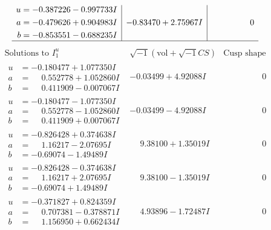 \documentclass[1p]{elsarticle_modified}
\theoremstyle{definition}
\newcommand{\I}{\sqrt{-1}}
\begin{document}
$$\begin{array}{c|c|c}
\begin{aligned}
u &= -0.387226 - 0.997733 I \\
a &= -0.479626 + 0.904983 I \\
b &= -0.853551 - 0.688235 I\end{aligned}
 & -0.83470 + 2.75967 I & \phantom{-0.000000 } 0\\
 \hline 
 \end{array}$$\newpage$$\begin{array}{c|c|c}  
\text{Solutions to }I^u_{1}& \I (\text{vol} + \sqrt{-1}CS) & \text{Cusp shape}\\
 \hline 
\begin{aligned}
u &= -0.180477 + 1.077350 I \\
a &= \phantom{-}0.552778 + 1.052860 I \\
b &= \phantom{-}0.411909 - 0.007067 I\end{aligned}
 & -0.03499 + 4.92088 I & \phantom{-0.000000 } 0 \\ \hline\begin{aligned}
u &= -0.180477 - 1.077350 I \\
a &= \phantom{-}0.552778 - 1.052860 I \\
b &= \phantom{-}0.411909 + 0.007067 I\end{aligned}
 & -0.03499 - 4.92088 I & \phantom{-0.000000 } 0 \\ \hline\begin{aligned}
u &= -0.826428 + 0.374638 I \\
a &= \phantom{-}1.16217 - 2.07695 I \\
b &= -0.69074 - 1.49489 I\end{aligned}
 & \phantom{-}9.38100 + 1.35019 I & \phantom{-0.000000 } 0 \\ \hline\begin{aligned}
u &= -0.826428 - 0.374638 I \\
a &= \phantom{-}1.16217 + 2.07695 I \\
b &= -0.69074 + 1.49489 I\end{aligned}
 & \phantom{-}9.38100 - 1.35019 I & \phantom{-0.000000 } 0 \\ \hline\begin{aligned}
u &= -0.371827 + 0.824359 I \\
a &= \phantom{-}0.707381 - 0.378871 I \\
b &= \phantom{-}1.156950 + 0.662434 I\end{aligned}
 & \phantom{-}4.93896 - 1.72487 I & \phantom{-0.000000 } 0 \\ \hline\begin{aligned}

\end{aligned}
\end{array}$$
\end{document}
